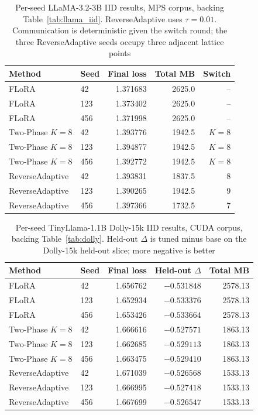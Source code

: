 \documentclass[iicol,pdflatex,sn-mathphys-num]{sn-jnl}
\begin{document}
\begin{appendices}
\begin{table}[tbp]
\centering
\footnotesize
\setlength{\tabcolsep}{6pt}
\caption{Per-seed LLaMA-3.2-3B IID results, MPS corpus, backing Table~\ref{tab:llama_iid}. ReverseAdaptive uses $\tau{=}0.01$. Communication is deterministic given the switch round; the three ReverseAdaptive seeds occupy three adjacent lattice points}
\label{tab:b3}
\begin{tabular}{@{}llrrr@{}}
\toprule
Method & Seed & Final loss & Total MB & Switch \\
\midrule
FLoRA & 42 & 1.371683 & 2625.0 & -- \\
FLoRA & 123 & 1.373402 & 2625.0 & -- \\
FLoRA & 456 & 1.371998 & 2625.0 & -- \\
Two-Phase $K{=}8$ & 42 & 1.393776 & 1942.5 & $K{=}8$ \\
Two-Phase $K{=}8$ & 123 & 1.394877 & 1942.5 & $K{=}8$ \\
Two-Phase $K{=}8$ & 456 & 1.392772 & 1942.5 & $K{=}8$ \\
ReverseAdaptive & 42 & 1.393831 & 1837.5 & 8 \\
ReverseAdaptive & 123 & 1.390265 & 1942.5 & 9 \\
ReverseAdaptive & 456 & 1.397366 & 1732.5 & 7 \\
\bottomrule
\end{tabular}
\end{table}

\begin{table}[tbp]
\centering
\footnotesize
\setlength{\tabcolsep}{6pt}
\caption{Per-seed TinyLlama-1.1B Dolly-15k IID results, CUDA corpus, backing Table~\ref{tab:dolly}. Held-out $\Delta$ is tuned minus base on the Dolly-15k held-out slice; more negative is better}
\label{tab:b4}
\begin{tabular}{@{}llrrr@{}}
\toprule
Method & Seed & Final loss & Held-out $\Delta$ & Total MB \\
\midrule
FLoRA & 42 & 1.656762 & $-0.531848$ & 2578.13 \\
FLoRA & 123 & 1.652934 & $-0.533376$ & 2578.13 \\
FLoRA & 456 & 1.653426 & $-0.533664$ & 2578.13 \\
Two-Phase $K{=}8$ & 42 & 1.666616 & $-0.527571$ & 1863.13 \\
Two-Phase $K{=}8$ & 123 & 1.662685 & $-0.529113$ & 1863.13 \\
Two-Phase $K{=}8$ & 456 & 1.663475 & $-0.529410$ & 1863.13 \\
ReverseAdaptive & 42 & 1.671039 & $-0.526568$ & 1533.13 \\
ReverseAdaptive & 123 & 1.666995 & $-0.527418$ & 1533.13 \\
ReverseAdaptive & 456 & 1.667699 & $-0.526547$ & 1533.13 \\
\bottomrule
\end{tabular}
\end{table}


\end{appendices}
\end{document}
